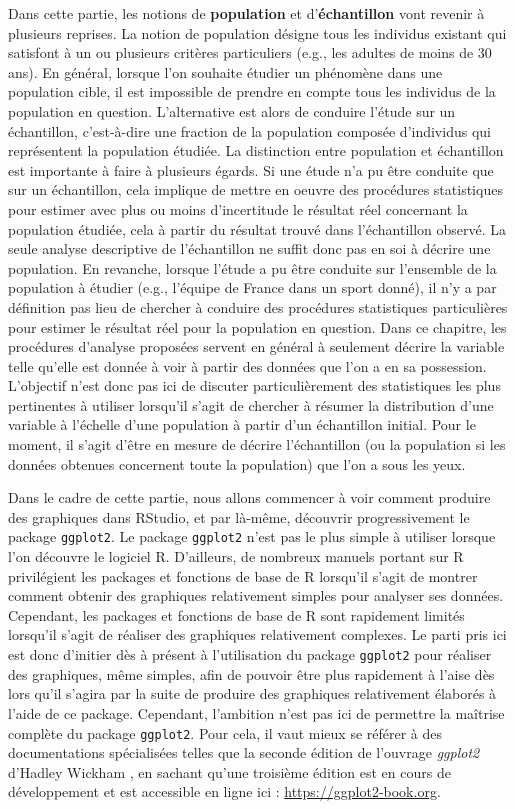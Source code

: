 \documentclass[
]{book}
\begin{document}
Dans cette partie, les notions de \textbf{population} et d'\textbf{échantillon} vont revenir à plusieurs reprises. La notion de population désigne tous les individus existant qui satisfont à un ou plusieurs critères particuliers (e.g., les adultes de moins de 30 ans). En général, lorsque l'on souhaite étudier un phénomène dans une population cible, il est impossible de prendre en compte tous les individus de la population en question. L'alternative est alors de conduire l'étude sur un échantillon, c'est-à-dire une fraction de la population composée d'individus qui représentent la population étudiée. La distinction entre population et échantillon est importante à faire à plusieurs égards. Si une étude n'a pu être conduite que sur un échantillon, cela implique de mettre en oeuvre des procédures statistiques pour estimer avec plus ou moins d'incertitude le résultat réel concernant la population étudiée, cela à partir du résultat trouvé dans l'échantillon observé. La seule analyse descriptive de l'échantillon ne suffit donc pas en soi à décrire une population. En revanche, lorsque l'étude a pu être conduite sur l'ensemble de la population à étudier (e.g., l'équipe de France dans un sport donné), il n'y a par définition pas lieu de chercher à conduire des procédures statistiques particulières pour estimer le résultat réel pour la population en question. Dans ce chapitre, les procédures d'analyse proposées servent en général à seulement décrire la variable telle qu'elle est donnée à voir à partir des données que l'on a en sa possession. L'objectif n'est donc pas ici de discuter particulièrement des statistiques les plus pertinentes à utiliser lorsqu'il s'agit de chercher à résumer la distribution d'une variable à l'échelle d'une population à partir d'un échantillon initial. Pour le moment, il s'agit d'être en mesure de décrire l'échantillon (ou la population si les données obtenues concernent toute la population) que l'on a sous les yeux.

Dans le cadre de cette partie, nous allons commencer à voir comment produire des graphiques dans RStudio, et par là-même, découvrir progressivement le package \texttt{ggplot2}. Le package \texttt{ggplot2} n'est pas le plus simple à utiliser lorsque l'on découvre le logiciel R. D'ailleurs, de nombreux manuels portant sur R privilégient les packages et fonctions de base de R lorsqu'il s'agit de montrer comment obtenir des graphiques relativement simples pour analyser ses données. Cependant, les packages et fonctions de base de R sont rapidement limités lorsqu'il s'agit de réaliser des graphiques relativement complexes. Le parti pris ici est donc d'initier dès à présent à l'utilisation du package \texttt{ggplot2} pour réaliser des graphiques, même simples, afin de pouvoir être plus rapidement à l'aise dès lors qu'il s'agira par la suite de produire des graphiques relativement élaborés à l'aide de ce package. Cependant, l'ambition n'est pas ici de permettre la maîtrise complète du package \texttt{ggplot2}. Pour cela, il vaut mieux se référer à des documentations spécialisées telles que la seconde édition de l'ouvrage \emph{ggplot2} d'Hadley Wickham \autocite*{wickhamGgplot22016}, en sachant qu'une troisième édition est en cours de développement et est accessible en ligne ici : \url{https://ggplot2-book.org}.
\end{document}
